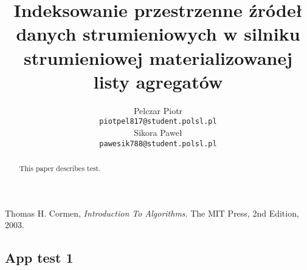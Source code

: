 \documentclass[12pt]{article}
\title{Indeksowanie przestrzenne źródeł danych strumieniowych w silniku strumieniowej materializowanej listy agregatów}
\author{
	  Pelczar Piotr\\
	  \small{\texttt{piotpel817@student.polsl.pl}}
	  \\[3ex]
	  Sikora Paweł\\
	  \small{\texttt{pawesik788@student.polsl.pl}}
	}
\date{\displaydate{date}}
\begin{document}
\maketitle
 
\begin{abstract}
This paper describes test.
\end{abstract}

\renewcommand{\contentsname}{Contents}

\newpage
\tableofcontents

\newpage











\newpage
\begin{thebibliography}{9}

  Thomas H. Cormen,
  \emph{Introduction To Algorithms}.
  The MIT Press,
  2nd Edition,
  2003.

\end{thebibliography}

\begin{appendices}
	\section{App test 1}
	\label{app:appTest1}

\end{appendices}
\end{document}
